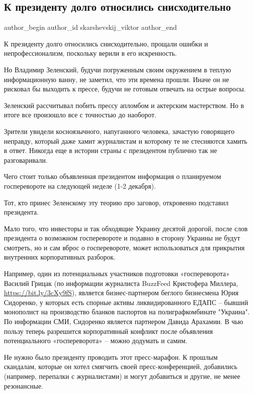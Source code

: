  
 
 
 
 
 
\subsection{К президенту долго относились снисходительно}
\label{sec:28_11_2021.fb.skarshevskij_viktor.1.prezident_snishozhdenie}
 
\ifcmt
 author_begin
   author_id skarshevskij_viktor
 author_end
\fi

К президенту долго относились снисходительно, прощали ошибки и
непрофессионализм, поскольку верили в его искренность. 

Но Владимир Зеленский, будучи погруженным своим окружением в теплую
информационную ванну, не заметил, что эти времена прошли. Иначе он не рисковал
бы выходить к прессе, будучи не готовым отвечать на острые вопросы. 

Зеленский рассчитывал побить прессу апломбом и актерским мастерством. Но в
итоге все произошло все с точностью до наоборот. 

Зрители увидели косноязычного, напуганного человека, зачастую говорящего
неправду, который даже хамит журналистам и которому те не стесняются хамить в
ответ. Никогда еще в истории страны с президентом публично так не
разговаривали.

Чего стоит только объявленная президентом информация о планируемом
госперевороте на следующей неделе (1-2 декабря). 

Тот, кто принес Зеленскому эту теорию про заговор, откровенно подставил
президента. 

Мало того, что инвесторы и так обходящие Украину десятой дорогой, после слов
президента о возможном госперевороте и подавно в сторону Украины не будут
смотреть, но и сам вброс о госперевороте, может использоваться для прикрытия
внутренних корпоративных разборок. 

Например, один из потенциальных участников подготовки «госпереворота» Василий
Грицак (по информации журналиста BuzzFeed Кристофера Миллера,
\url{https://bit.ly/3cXy9fS}), является бизнес-партнером беглого бизнесмена Юрия
Сидоренко, у которых есть спорные активы ликвидированного ЕДАПС – бывший
монополист на производство бланков паспортов на полиграфкомбинате "Украина".
По информации СМИ, Сидоренко является партнером Давида Арахамии. В чью пользу
теперь разрешится корпоративный конфликт после объявления потенциального
«госпереворота» – можно додумать и самим.

Не нужно было президенту проводить этот пресс-марафон. К прошлым скандалам,
которые он хотел смягчить своей пресс-конференцией, добавились (например,
перепалки с журналистами) и могут добавиться и другие, не менее резонансные.

